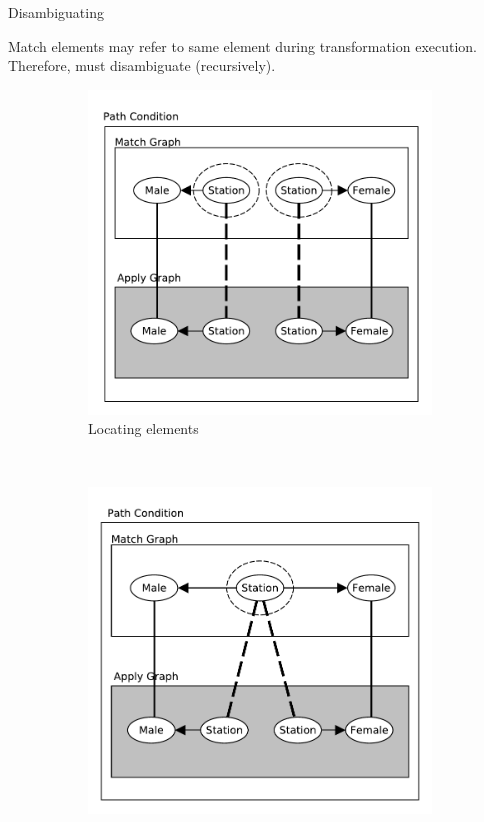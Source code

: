 \documentclass[xcolor=dvipsnames, 14pt]{beamer}
\begin{document}
\begin{frame}{Disambiguating}

Match elements may refer to same element during transformation execution. Therefore, must disambiguate (recursively).
\begin{figure}[htb]
        \centering
        \begin{subfigure}[b]{0.40\textwidth}
                \centering
                \includegraphics[width=1\textwidth]{../figures/building_path_conditions/collapse_locate_match.pdf}
                \caption{Locating elements}
                \label{fig:collapse_locate_match}
        \end{subfigure}%
        ~~
        \begin{subfigure}[b]{0.40\textwidth}
                \centering
                \includegraphics[width=1\textwidth]{../figures/building_path_conditions/collapse_merge_match.pdf}

\end{subfigure}
\end{figure}
\end{frame}
\end{document}
